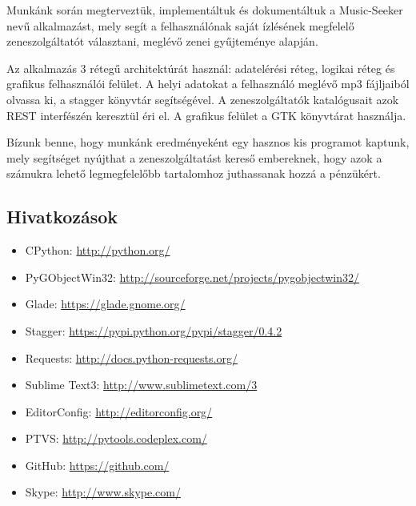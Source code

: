 Munkánk során megterveztük, implementáltuk és dokumentáltuk a Music-Seeker nevű alkalmazást, mely segít a felhasználónak saját ízlésének megfelelő zeneszolgáltatót választani, meglévő zenei gyűjteménye alapján.

Az alkalmazás 3 rétegű architektúrát használ: adatelérési réteg, logikai réteg és grafikus felhasználói felület. A helyi adatokat a felhasználó meglévő mp3 fájljaiból olvassa ki, a stagger könyvtár segítségével. A zeneszolgáltatók katalógusait azok REST interfészén keresztül éri el. A grafikus felület a GTK könyvtárat használja.

Bízunk benne, hogy munkánk eredményeként egy hasznos kis programot kaptunk, mely segítséget nyújthat a zeneszolgáltatást kereső embereknek, hogy azok a számukra lehető legmegfelelőbb tartalomhoz juthassanak hozzá a pénzükért.


\subsection{Hivatkozások}
\label{sub:hivatkozasok}

\begin{itemize}
	\item CPython: \url{http://python.org/}
	\item PyGObjectWin32: \url{http://sourceforge.net/projects/pygobjectwin32/}
	\item Glade: \url{https://glade.gnome.org/}
	\item Stagger: \url{https://pypi.python.org/pypi/stagger/0.4.2}
	\item Requests: \url{http://docs.python-requests.org/}
	\item Sublime Text3: \url{http://www.sublimetext.com/3}
	\item EditorConfig: \url{http://editorconfig.org/}
	\item PTVS: \url{http://pytools.codeplex.com/}
	\item GitHub: \url{https://github.com/}
	\item Skype: \url{http://www.skype.com/}
\end{itemize}

  

